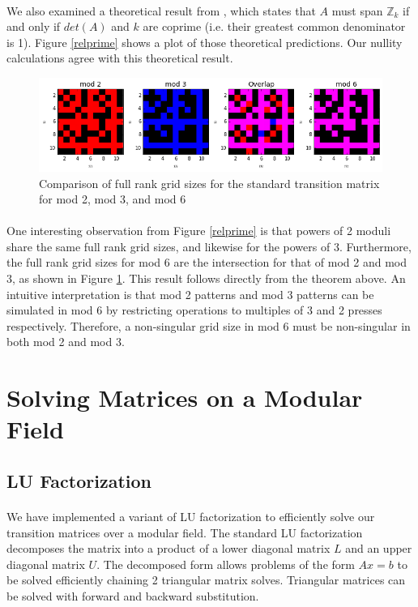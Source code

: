 \documentclass[11pt]{article}
\begin{document}
\paragraph{} We also examined a theoretical result from \cite{involve}, which states that $A$ must span $\mathbb{Z}_k$ if and only if $det(A)$ and $k$ are coprime (i.e. their greatest common denominator is 1). Figure \ref{relprime} shows a plot of those theoretical predictions.  Our nullity calculations agree with this theoretical result.

\begin{figure}
\caption{Comparison of full rank grid sizes for the standard transition matrix for mod 2, mod 3, and mod 6}
\label{overlap236}
\includegraphics[width=\textwidth]{mod6overlap.png}
\end{figure}

\paragraph{} One interesting observation from Figure \ref{relprime} is that powers of 2 moduli share the same full rank grid sizes, and likewise for the powers of 3.  Furthermore, the full rank grid sizes for mod 6 are the intersection for that of mod 2 and mod 3, as shown in Figure \ref{overlap236}.  This result follows directly from the theorem above.  An intuitive interpretation is that mod 2 patterns and mod 3 patterns can be simulated in mod 6 by restricting operations to multiples of 3 and 2 presses respectively.  Therefore, a non-singular grid size in mod 6 must be non-singular in both mod 2 and mod 3.

\section*{Solving Matrices on a Modular Field}

\subsection*{LU Factorization}

\paragraph{} We have implemented a variant of LU factorization to efficiently solve our transition matrices over a modular field.  The standard LU factorization decomposes the matrix into a product of a lower diagonal matrix $L$ and an upper diagonal matrix $U$.  The decomposed form allows problems of the form $Ax = b$ to be solved efficiently chaining 2 triangular matrix solves.  Triangular matrices can be solved with forward and backward substitution.
\end{document}
